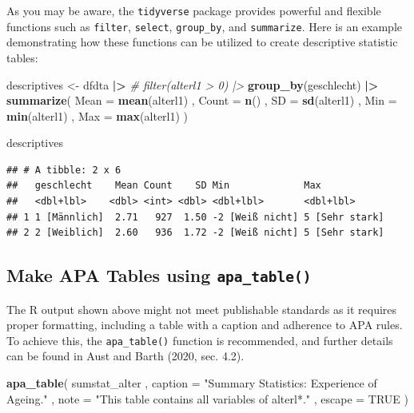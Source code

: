 \documentclass[
  doc]{apa6}
\newenvironment{Shaded}{\begin{snugshade}}{\end{snugshade}}
\newcommand{\AttributeTok}[1]{\textcolor[rgb]{0.13,0.29,0.53}{#1}}
\newcommand{\CommentTok}[1]{\textcolor[rgb]{0.56,0.35,0.01}{\textit{#1}}}
\newcommand{\ConstantTok}[1]{\textcolor[rgb]{0.56,0.35,0.01}{#1}}
\newcommand{\FunctionTok}[1]{\textcolor[rgb]{0.13,0.29,0.53}{\textbf{#1}}}
\newcommand{\NormalTok}[1]{#1}
\newcommand{\OtherTok}[1]{\textcolor[rgb]{0.56,0.35,0.01}{#1}}
\newcommand{\SpecialCharTok}[1]{\textcolor[rgb]{0.81,0.36,0.00}{\textbf{#1}}}
\newcommand{\StringTok}[1]{\textcolor[rgb]{0.31,0.60,0.02}{#1}}
\begin{document}
As you may be aware, the \texttt{tidyverse} package provides powerful and flexible functions such as \texttt{filter}, \texttt{select}, \texttt{group\_by}, and \texttt{summarize}. Here is an example demonstrating how these functions can be utilized to create descriptive statistic tables:

\begin{Shaded}
\begin{Highlighting}[]
\NormalTok{descriptives }\OtherTok{\textless{}{-}}\NormalTok{ dfdta }\SpecialCharTok{|\textgreater{}}  
  \CommentTok{\# filter(alterl1 \textgreater{} 0) |\textgreater{} }
  \FunctionTok{group\_by}\NormalTok{(geschlecht)  }\SpecialCharTok{|\textgreater{}} 
  \FunctionTok{summarize}\NormalTok{(}
    \AttributeTok{Mean =} \FunctionTok{mean}\NormalTok{(alterl1)}
\NormalTok{    , }\AttributeTok{Count =} \FunctionTok{n}\NormalTok{()}
\NormalTok{    , }\AttributeTok{SD =} \FunctionTok{sd}\NormalTok{(alterl1)}
\NormalTok{    , }\AttributeTok{Min =} \FunctionTok{min}\NormalTok{(alterl1)}
\NormalTok{    , }\AttributeTok{Max =} \FunctionTok{max}\NormalTok{(alterl1)}
\NormalTok{  )}

\NormalTok{descriptives}
\end{Highlighting}
\end{Shaded}

\begin{verbatim}
## # A tibble: 2 x 6
##   geschlecht    Mean Count    SD Min             Max           
##   <dbl+lbl>    <dbl> <int> <dbl> <dbl+lbl>       <dbl+lbl>     
## 1 1 [Männlich]  2.71   927  1.50 -2 [Weiß nicht] 5 [Sehr stark]
## 2 2 [Weiblich]  2.60   936  1.72 -2 [Weiß nicht] 5 [Sehr stark]
\end{verbatim}

\hypertarget{make-apa-tables-using-apa_table}{%
\subsection{\texorpdfstring{Make APA Tables using \texttt{apa\_table()}}{Make APA Tables using apa\_table()}}\label{make-apa-tables-using-apa_table}}

The R output shown above might not meet publishable standards as it requires proper formatting, including a table with a caption and adherence to APA rules. To achieve this, the \texttt{apa\_table()} function is recommended, and further details can be found in Aust and Barth (2020, sec. 4.2).

\begin{Shaded}
\begin{Highlighting}[]
\FunctionTok{apa\_table}\NormalTok{(}
\NormalTok{  sumstat\_alter}
\NormalTok{  , }\AttributeTok{caption =} \StringTok{"Summary Statistics: Experience of Ageing."}
\NormalTok{  , }\AttributeTok{note =} \StringTok{"This table contains all variables of \textasciigrave{}alterl*\textasciigrave{}."}
\NormalTok{  , }\AttributeTok{escape =} \ConstantTok{TRUE}
\NormalTok{  )}
\end{Highlighting}
\end{Shaded}
\end{document}
